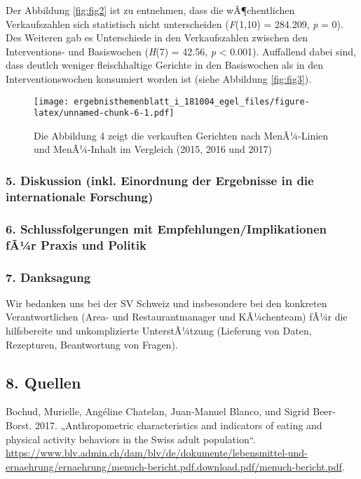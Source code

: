 \documentclass[12pt,ngerman,]{article}
\begin{document}
Der Abbildung \ref{fig:fig2} ist zu entnehmen, dass die wÃ¶chentlichen
Verkaufszahlen sich statistisch nicht unterscheiden (\emph{F}(1,10) =
284.209, \emph{p} = 0). Des Weiteren gab es Unterschiede in den
Verkaufszahlen zwischen den Interventions- und Basiswochen (\emph{H}(7)
= 42.56, \emph{p} \textless{} 0.001). Auffallend dabei sind, dass
deutlch weniger fleischhaltige Gerichte in den Basiswochen als in den
Interventionswochen konsumiert worden ist (siehe Abbildung
\ref{fig:fig3}).

\begin{figure}
\centering
\texttt{[image: ergebnisthemenblatt\_i\_181004\_egel\_files/figure-latex/unnamed-chunk-6-1.pdf]}
\caption{\label{fig:fig4} Die Abbildung 4 zeigt die verkauften Gerichten
nach MenÃ¼-Linien und MenÃ¼-Inhalt im Vergleich (2015, 2016 und 2017)}
\end{figure}

\hypertarget{diskussion-inkl.-einordnung-der-ergebnisse-in-die-internationale-forschung}{%
\subsubsection{5. Diskussion (inkl. Einordnung der Ergebnisse in die
internationale
Forschung)}\label{diskussion-inkl.-einordnung-der-ergebnisse-in-die-internationale-forschung}}

\hypertarget{schlussfolgerungen-mit-empfehlungenimplikationen-far-praxis-und-politik}{%
\subsubsection{6. Schlussfolgerungen mit Empfehlungen/Implikationen fÃ¼r
Praxis und
Politik}\label{schlussfolgerungen-mit-empfehlungenimplikationen-far-praxis-und-politik}}

\hypertarget{danksagung}{%
\subsubsection{7. Danksagung}\label{danksagung}}

Wir bedanken uns bei der SV Schweiz und insbesondere bei den konkreten
Verantwortlichen (Area- und Restaurantmanager und KÃ¼chenteam) fÃ¼r die
hilfsbereite und unkomplizierte UnterstÃ¼tzung (Lieferung von Daten,
Rezepturen, Beantwortung von Fragen).

\hypertarget{quellen}{%
\subsection*{8. Quellen}\label{quellen}}

\hypertarget{refs}{}
\leavevmode\hypertarget{ref-bochud_anthropometric_2017}{}%
Bochud, Murielle, Angéline Chatelan, Juan-Manuel Blanco, und Sigrid
Beer-Borst. 2017. „Anthropometric characteristics and indicators of
eating and physical activity behaviors in the Swiss adult population``.
\url{https://www.blv.admin.ch/dam/blv/de/dokumente/lebensmittel-und-ernaehrung/ernaehrung/menuch-bericht.pdf.download.pdf/menuch-bericht.pdf}.
\end{document}
